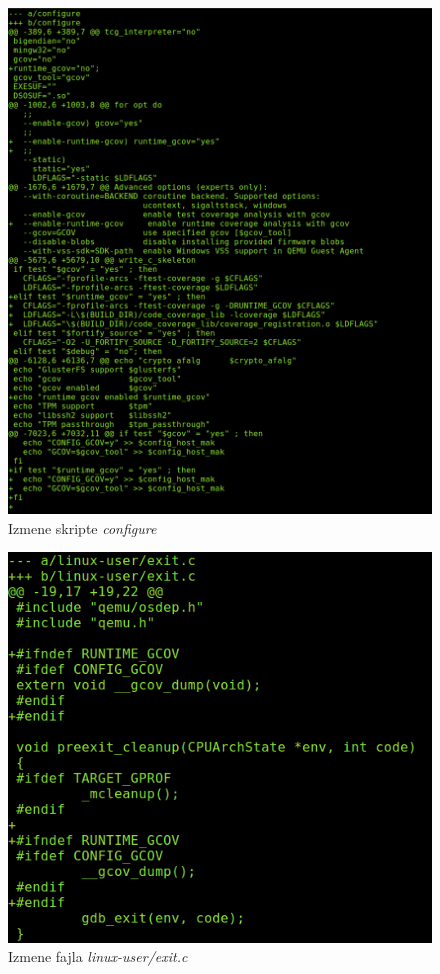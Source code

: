 \documentclass[12pt,oneside]{memoir}
\newcommand{\strano}[1]{\textit{#1}}
\begin{document}
\begin{figure}[!ht]
  \centering
  \includegraphics[width=\textwidth]{img/configure.png}
  \caption{Izmene skripte \strano{configure}}
  \label{fig:qemu-diff-1}
\end{figure}

\begin{figure}[!ht]
  \centering
  \includegraphics[width=\textwidth]{img/exit.png}
  \caption{Izmene fajla \strano{linux-user/exit.c}}
  \label{fig:qemu-diff-2}
\end{figure}
\end{document}
